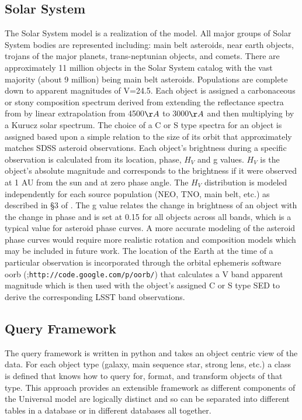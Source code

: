 \documentclass[]{article}
\begin{document}
\subsection{Solar System \label{sec:ssm}}

The Solar System model is a realization of the \citet{grav11} model.
All major groups of Solar System bodies are represented including:
main belt asteroids, near earth objects, trojans of the major planets,
trans-neptunian objects, and comets. There are approximately 11
million objects in the Solar System catalog with the vast majority (about 9 million) being
main belt asteroids. Populations are complete down to apparent
magnitudes of V=24.5.  Each object is assigned a carbonaceous or stony
composition spectrum derived from extending the reflectance spectra
from \citet{demeo} by linear extrapolation from 4500$\AA$ to 3000$\AA$
and then multiplying by a Kurucz solar spectrum. The choice of a
C or S type spectra for an object is assigned based upon a simple
relation to the size of its orbit that approximately matches SDSS
asteroid observations. Each object's brightness during a specific
observation is calculated from its location, phase, $H_V$ and g
values. $H_V$ is the object's absolute magnitude and corresponds to the
brightness if it were observed at 1 AU from the sun and at zero phase
angle.  The $H_V$ distribution is modeled independently for each
source population (NEO, TNO, main belt, etc.)  as described in \S 3 of
\citet{grav11}.  The g value relates the change in brightness of an
object with the change in phase and is set at 0.15 for all objects
across all bands, which is a typical value for asteroid phase curves.
A more accurate modeling of the asteroid phase curves would require
more realistic rotation and composition models which may be included
in future work.  The location of the Earth at the time of a
particular observation is incorporated through the orbital ephemeris software oorb
(\citet{granvik};{\tt http://code.google.com/p/oorb/}) that calculates a V
band apparent magnitude which is then used with the object's assigned
C or S type SED to derive the corresponding LSST band observations.

\subsection{Query Framework}
The query framework is written in python and takes an object centric view of the 
data.  For each object type (galaxy, main sequence star, strong lens, etc.) a class
is defined that knows how to query for, format, and transform objects of that type.  
This approach provides an extensible framework as different components of the Universal model
are logically distinct and so can be separated into different tables in a database
or in different databases all together.
\end{document}
